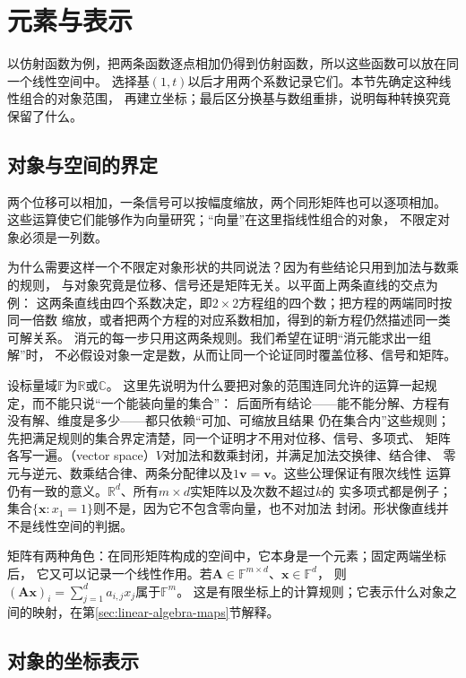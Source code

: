 \section{元素与表示}
\label{sec:linear-algebra-space-representations}
\label{sec:linear-algebra-vector-spaces-coordinates}


以仿射函数为例，把两条函数逐点相加仍得到仿射函数，所以这些函数可以放在同一个线性空间中。
选择基$(1,t)$以后才用两个系数记录它们。本节先确定这种线性组合的对象范围，
再建立坐标；最后区分换基与数组重排，说明每种转换究竟保留了什么。

\subsection{对象与空间的界定}
\label{sec:linear-algebra-objects}

两个位移可以相加，一条信号可以按幅度缩放，两个同形矩阵也可以逐项相加。
这些运算使它们能够作为向量研究；“向量”在这里指线性组合的对象，
不限定对象必须是一列数。

为什么需要这样一个不限定对象形状的共同说法？因为有些结论只用到加法与数乘的规则，
与对象究竟是位移、信号还是矩阵无关。以平面上两条直线的交点为例：
这两条直线由四个系数决定，即$2\times2$方程组的四个数；把方程的两端同时按同一倍数
缩放，或者把两个方程的对应系数相加，得到的新方程仍然描述同一类可解关系。
消元的每一步只用这两条规则。我们希望在证明“消元能求出一组解”时，
不必假设对象一定是数，从而让同一个论证同时覆盖位移、信号和矩阵。

设标量域$\mathbb F$为$\mathbb R$或$\mathbb C$。
这里先说明为什么要把对象的范围连同允许的运算一起规定，而不能只说“一个能装向量的集合”：
后面所有结论——能不能分解、方程有没有解、维度是多少——都只依赖“可加、可缩放且结果
仍在集合内”这些规则；先把满足规则的集合界定清楚，同一个证明才不用对位移、信号、多项式、
矩阵各写一遍。（vector space）$V$对加法和数乘封闭，并满足加法交换律、结合律、
零元与逆元、数乘结合律、两条分配律以及$1\bm v=\bm v$。这些公理保证有限次线性
运算仍有一致的意义。$\mathbb R^d$、所有$m\times d$实矩阵以及次数不超过$k$的
实多项式都是例子；集合$\{\bm x:x_1=1\}$则不是，因为它不包含零向量，也不对加法
封闭。形状像直线并不是线性空间的判据。


矩阵有两种角色：在同形矩阵构成的空间中，它本身是一个元素；固定两端坐标后，
它又可以记录一个线性作用。若$\bm A\in\mathbb F^{m\times d}$、$\bm x\in\mathbb F^d$，
则$(\bm A\bm x)_i=\sum_{j=1}^d a_{i,j}x_j$属于$\mathbb F^m$。
这是有限坐标上的计算规则；它表示什么对象之间的映射，在第\ref{sec:linear-algebra-maps}节解释。

\subsection{对象的坐标表示}
\label{sec:linear-algebra-coordinates}

